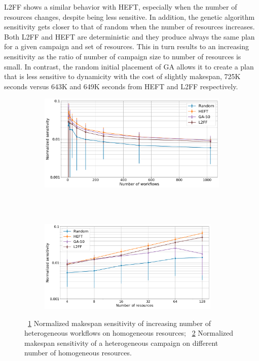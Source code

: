 L2FF shows a similar behavior with HEFT, especially when the number of resources changes, despite being less sensitive.
In addition, the genetic algorithm sensitivity gets closer to that of random when the number of resources increases.
Both L2FF and HEFT are deterministic and they produce always the same plan for a given campaign and set of resources.
This in turn results to an increasing sensitivity as the ratio of number of campaign size to number of resources is small.
In contrast, the random initial placement of GA allows it to create a plan that is less sensitive to dynamicity with the cost of slightly makespan, 725K seconds versus 643K and 649K seconds from HEFT and L2FF respectively.

\begin{figure}[ht!]
    \centering
    \begin{subfigure}[b]{0.75\textwidth}
        \includegraphics[width=.95\textwidth]{figures/campaign/StHeteroCampaigns_4DynHomoResourcesSens.pdf}
        \caption{}
        \label{fig:StHeteroCampaigns_4DynHomoResourcesSens}
    \end{subfigure}\\
    ~ 
    \begin{subfigure}[b]{0.75\textwidth}
        \includegraphics[width=0.95\textwidth]{figures/campaign/DynHomoResources_StHeteroCampaignsSens.pdf}
        \caption{}
        \label{fig:DynHomoResources_StHeteroCampaignsSens}
    \end{subfigure}
    \caption{~\ref{fig:StHeteroCampaigns_4DynHomoResourcesSens} Normalized makespan sensitivity  of increasing number of heterogeneous workflows on homogeneous resources;
        ~\ref{fig:DynHomoResources_StHeteroCampaignsSens} Normalized makespan sensitivity  of a heterogeneous campaign on different number of homogeneous resources.}
    \label{fig:dyn_hetero_homog_sens_analysis}
\end{figure}

